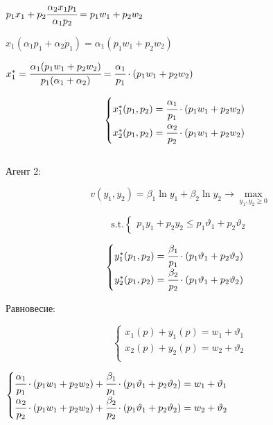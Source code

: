 \documentclass[reqno]{article}
\theoremstyle{definition}
\theoremstyle{definition}
\theoremstyle{definition}
\theoremstyle{definition}
\theoremstyle{definition}
\theoremstyle{definition}
\theoremstyle{definition}
\theoremstyle{definition}
\theoremstyle{definition}
\begin{document}
			$p_1x_1+p_2 \cfrac{\alpha_2 x_1 p_1}{\alpha_1 p_2} = p_1w_1+p_2w_2$
			
			$x_1(\alpha_1 p_1 + \alpha_2 p_1) = \alpha_1(p_1 w_1+p_2 w_2)$
			
			$x_1^* = \cfrac{\alpha_1(p_1 w_1+p_2 w_2)}{p_1(\alpha_1+\alpha_2)} = \cfrac{\alpha_1}{p_1} \cdot (p_1 w_1+p_2 w_2) $
			
			$$
			\begin{cases}
				x_1^*(p_1,p_2) = \cfrac{\alpha_1}{p_1} \cdot (p_1 w_1+p_2 w_2)\\
				
				x_2^*(p_1,p_2) = \cfrac{\alpha_2}{p_2} \cdot (p_1 w_1+p_2 w_2)\\
			\end{cases}
			$$ \\
			
			Агент 2:
			
			$$v(y_1, y_2) = \beta_1 \ln y_1 + \beta_2 \ln y_2 \rightarrow \max_{y_1,y_2 \geq 0}$$
			
			$$
			\text{s.t.}
			\begin{cases}
				p_1 y_1+p_2 y_2 \leq p_1 \vartheta_1 + p_2 \vartheta_2
			\end{cases}
			$$
			
			$$
			\begin{cases}
				y_1^*(p_1,p_2) = \cfrac{\beta_1}{p_1} \cdot (p_1 \vartheta_1+p_2 \vartheta_2)\\
				
				y_2^*(p_1,p_2) = \cfrac{\beta_2}{p_2} \cdot (p_1 \vartheta_1+p_2 \vartheta_2)\\
			\end{cases}
			$$
			
			Равновесие:
			
			$$
			\begin{cases}
				x_1(p) + y_1(p) = w_1 + \vartheta_1\\
				
				x_2(p) + y_2(p) = w_2 + \vartheta_2\\
			\end{cases}
			$$
			
			$
			\begin{cases}
				\cfrac{\alpha_1}{p_1} \cdot (p_1 w_1+p_2 w_2) + \cfrac{\beta_1}{p_1} \cdot (p_1 \vartheta_1 + p_2 \vartheta_2) = w_1 + \vartheta_1\\
				
				\cfrac{\alpha_2}{p_2} \cdot (p_1 w_1+p_2 w_2) + \cfrac{\beta_2}{p_2} \cdot (p_1 \vartheta_1 + p_2 \vartheta_2) = w_2 + \vartheta_2\\
			\end{cases}
			$
			
\end{document}

